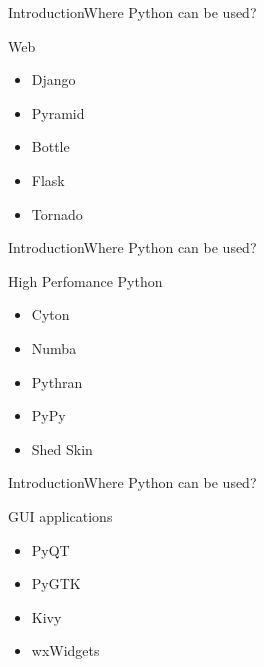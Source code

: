 \documentclass[10pt]{beamer}
\begin{document}
\begin{frame}{Introduction}{Where Python can be used?}
	
	\begin{block}{Web}
		\begin{itemize}
			\item Django
			
			\item Pyramid
			
			\item Bottle
			
			\item Flask
			
			\item Tornado
		\end{itemize}
		
	\end{block}
\end{frame}

\begin{frame}{Introduction}{Where Python can be used?}
	
	\begin{block}{High Perfomance Python}
		\begin{itemize}
			\item Cyton
			
			\item Numba
			
			\item Pythran
			
			\item PyPy
			
			\item Shed Skin
		\end{itemize}
		
	\end{block}
\end{frame}

\begin{frame}{Introduction}{Where Python can be used?}
	
	\begin{block}{GUI applications}
		\begin{itemize}
			\item PyQT
			
			\item PyGTK
			
			\item Kivy
			
			\item wxWidgets
	
		\end{itemize}
		
	\end{block}
\end{frame}
\end{document}
